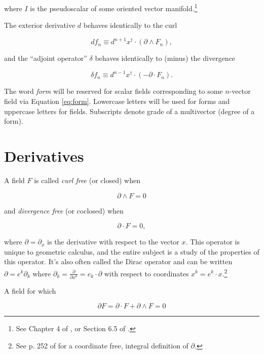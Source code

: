 \documentclass{article}
\begin{document}
where $I$ is the pseudoscalar of some oriented vector manifold.\footnote{See Chapter 4 of \cite{cagc}, or Section 6.5 of \cite{gap}.}

The exterior derivative $d$ behaves identically to the curl

\begin{equation}
  d f_n \equiv d^{n+1}x^\dagger \cdot (\partial \wedge F_n),\label{eq:curl}
\end{equation}

and the ``adjoint operator'' $\delta$ behaves identically to (minus) the divergence

\begin{equation}
  \delta f_n \equiv d^{n-1}x^\dagger \cdot (-\partial \cdot F_n).\label{eq:divergence}
\end{equation} 

The word \emph{form} will be reserved for scalar fields corresponding to some $n$-vector field via Equation \ref{eq:form}. Lowercase letters will be used for forms and uppercase letters for fields. Subscripts denote grade of a multivector (degree of a form).

\section{Derivatives}

A field $F$ is called \emph{curl free} (or closed) when 

\begin{equation}
  \partial \wedge F = 0
\end{equation}

and \emph{divergence free} (or coclosed) when 

\begin{equation}
  \partial \cdot F = 0,
\end{equation}

where $\partial = \partial_x$ is the derivative with respect to the vector $x$. This operator is unique to geometric calculus, and the entire subject is a study of the properties of this operator. It's also often called the Dirac operator and can be written $\partial = e^k \partial_k$ where $\partial_k = \frac{\partial}{\partial x^k} = e_k \cdot \partial$ with respect to coordinates $x^k = e^k \cdot x$.\footnote{See p. 252 of \cite{cagc} for a coordinate free, integral definition of $\partial$.}

A field for which

\begin{equation}
  \partial F = \partial \cdot F + \partial \wedge F = 0
\end{equation}
\end{document}
